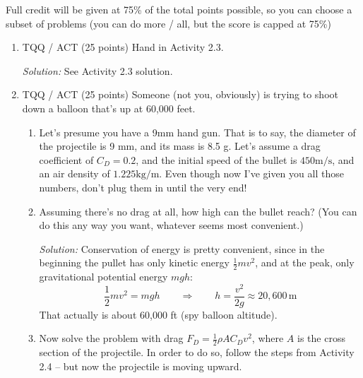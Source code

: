 \documentclass[12pt]{article}
\newcommand{\s}{\textrm{s}}
\newcommand{\m}{\textrm{m}}
\newcommand{\kg}{\textrm{kg}}
\newcommand{\soln}[1] {\textit{Solution:} #1}
\begin{document}
Full credit will be given at 75\% of the total points possible, so you can choose a subset of problems (you can do more / all, but the score is capped at 75\%)

\begin{enumerate}
  \item TQQ / ACT (25 points) Hand in Activity 2.3.

        \soln{See Activity 2.3 solution.}

  \item TQQ / ACT (25 points) Someone (not you, obviously) is trying to shoot down a balloon that's up at 60,000 feet.

        \begin{enumerate}
          \item Let's presume you have a 9mm hand gun. That is to say, the diameter of the projectile is 9 mm, and its mass is 8.5 g. Let's assume a drag coefficient of $C_D = 0.2$, and the initial speed of the bullet is $450 \m/\s$, and an air density of $1.225 \kg/\m$. Even though now I've given you all those numbers, don't plug them in until the very end!

          \item Assuming there's no drag at all, how high can the bullet reach? (You can do this any way you want, whatever seems most convenient.)

                \soln{Conservation of energy is pretty convenient, since in the beginning the pullet has only kinetic energy $\frac{1}{2}mv^2$, and at the peak, only gravitational potential energy $mgh$:
                  $$
                    \frac{1}{2}mv^2 = mgh \qquad \Longrightarrow \qquad h = \frac{v^2}{2g} \approx 20,600\,\m
                  $$
                  That actually is about 60,000 ft (spy balloon altitude).
                }

          \item Now solve the problem with drag $F_D = \frac{1}{2} \rho A C_D v^2$, where $A$ is the cross section of the projectile. In order to do so, follow the steps from Activity 2.4 -- but now the projectile is moving upward.


\end{enumerate}
\end{enumerate}
\end{document}
